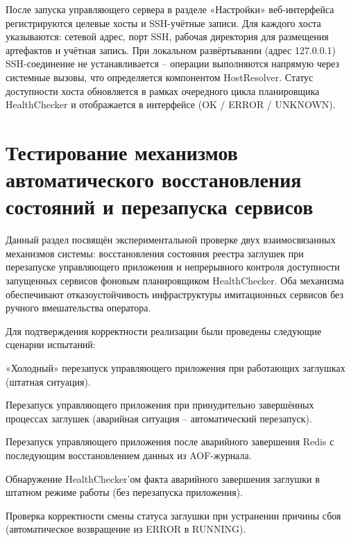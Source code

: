 
После запуска управляющего сервера в разделе «Настройки» веб-интерфейса регистрируются целевые хосты и SSH-учётные записи. Для каждого хоста указываются: сетевой адрес, порт SSH, рабочая директория для размещения артефактов и учётная запись. При локальном развёртывании (адрес 127.0.0.1) SSH-соединение не устанавливается -- операции выполняются напрямую через системные вызовы, что определяется компонентом HostResolver. Статус доступности хоста обновляется в рамках очередного цикла планировщика HealthChecker и отображается в интерфейсе (OK / ERROR / UNKNOWN).

\section{Тестирование механизмов автоматического восстановления состояний и перезапуска сервисов}
\label{sec:testing-restore}


Данный раздел посвящён экспериментальной проверке двух взаимосвязанных механизмов системы: восстановления состояния реестра заглушек при перезапуске управляющего приложения и непрерывного контроля доступности запущенных сервисов фоновым планировщиком HealthChecker. Оба механизма обеспечивают отказоустойчивость инфраструктуры имитационных сервисов без ручного вмешательства оператора.

Для подтверждения корректности реализации были проведены следующие сценарии испытаний:

\begin{compactlist}
  \item «Холодный» перезапуск управляющего приложения при работающих заглушках (штатная ситуация).
  \item Перезапуск управляющего приложения при принудительно завершённых процессах заглушек (аварийная ситуация -- автоматический перезапуск).
  \item Перезапуск управляющего приложения после аварийного завершения Redis с последующим восстановлением данных из AOF-журнала.
  \item Обнаружение HealthChecker'ом факта аварийного завершения заглушки в штатном режиме работы (без перезапуска приложения).
  \item Проверка корректности смены статуса заглушки при устранении причины сбоя (автоматическое возвращение из ERROR в RUNNING).
\end{compactlist}

